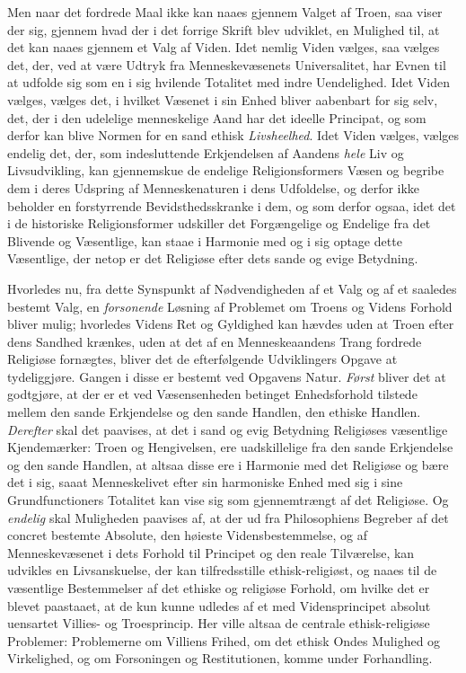 Men naar det fordrede Maal ikke kan naaes gjennem Valget af Troen, saa viser
der sig, gjennem hvad der i det forrige Skrift blev udviklet, en Mulighed til,
at det kan naaes gjennem et Valg af Viden. Idet nemlig Viden vælges, saa
vælges det, der, ved at være Udtryk fra Menneskevæsenets Universalitet, har
Evnen til at udfolde sig som en i sig hvilende Totalitet med indre
Uendelighed. Idet Viden vælges, vælges det, i hvilket Væsenet i sin Enhed
bliver aabenbart for sig selv, det, der i den udelelige menneskelige Aand har
det ideelle Principat, og som derfor kan blive Normen for en sand ethisk
\emph{Livsheelhed}. Idet Viden vælges, vælges endelig det, der, som
indesluttende Erkjendelsen af Aandens \emph{hele} Liv og Livsudvikling, kan
gjennemskue de endelige Religionsformers Væsen og begribe dem i deres Udspring
af Menneskenaturen i dens Udfoldelse, og derfor ikke beholder en forstyrrende
Bevidsthedsskranke i dem, og som derfor ogsaa, idet det i de historiske
Religionsformer udskiller det Forgængelige og Endelige fra det Blivende og
Væsentlige, kan staae i Harmonie med og i sig optage dette Væsentlige, der
netop er det Religiøse efter dets sande og evige Betydning.

Hvorledes nu, fra dette Synspunkt af Nødvendigheden af et Valg og af et
saaledes bestemt Valg, en \emph{forsonende} Løsning af Problemet om Troens og
Videns Forhold bliver mulig; hvorledes Videns Ret og Gyldighed kan hævdes uden
at Troen efter dens Sandhed krænkes, uden at det
 af en Menneskeaandens Trang fordrede Religiøse fornægtes, bliver det de
efterfølgende Udviklingers Opgave at tydeliggjøre. Gangen i disse er bestemt
ved Opgavens Natur. \emph{Først} bliver det at godtgjøre, at der er et ved
Væsensenheden betinget Enhedsforhold tilstede mellem den sande Erkjendelse og
den sande Handlen, den ethiske Handlen. \emph{Derefter} skal det paavises, at
det i sand og evig Betydning Religiøses væsentlige Kjendemærker: Troen og
Hengivelsen, ere uadskillelige fra den sande Erkjendelse og den sande Handlen,
at altsaa disse ere i Harmonie med det Religiøse og bære det i sig, saaat
Menneskelivet efter sin harmoniske Enhed med sig i sine Grundfunctioners
Totalitet kan vise sig som gjennemtrængt af det Religiøse. Og
\emph{endelig} skal Muligheden paavises af, at der ud fra Philosophiens
Begreber af det concret bestemte Absolute, den høieste Vidensbestemmelse, og
af Menneskevæsenet i dets Forhold til Principet og den reale Tilværelse, kan
udvikles en Livsanskuelse, der kan tilfredsstille ethisk-religiøst, og naaes
til de væsentlige Bestemmelser af det ethiske og religiøse Forhold, om hvilke
det er blevet paastaaet, at de kun kunne udledes af et med Vidensprincipet
absolut uensartet Villies- og Troesprincip. Her ville altsaa de centrale
ethisk-religiøse Problemer: Problemerne om Villiens Frihed, om det ethisk
Ondes Mulighed og Virkelighed, og om Forsoningen og Restitutionen, komme under
Forhandling.

